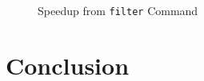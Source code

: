 \documentclass{article}
\begin{document}
\begin{figure}[H]
	\centerline{}
	\caption{Speedup from \texttt{filter} Command}
	\label{fig::speedup}
\end{figure}

\section{Conclusion}
\end{document}
